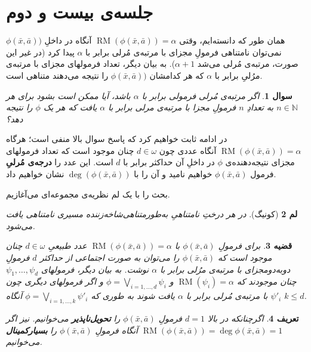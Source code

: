 \documentclass[12pt,a4paper]{report}
\theoremstyle{colorhead}
\newtheorem{thm}{قضیه}
\newtheorem{defn}[thm]{تعریف}
\newtheorem{soal}[thm]{سوال}
\newtheorem{lem}[thm]{لم}
\DeclareMathOperator{\RM}{RM}
\begin{document}
\section{جلسه‌ی بیست و دوم}
همان طور که دانسته‌ایم،
وقتی
$\RM(\phi(\bar{x},\bar{a}))=\alpha$
آنگاه در داخلِ
$\phi(\bar{x},\bar{a}))$
نمی‌توان نامتناهی فرمولِ مجزای با مرتبه‌ی مُرلی برابر با 
$\alpha$
پیدا کرد
(در غیر این صورت، مرتبه‌ی مُرلی 
می‌شد
$\alpha+1$).
 به بیان دیگر، تعداد فرمولهای مجزای با مرتبه‌ی مرُلیِ برابر با 
$\alpha$
که هر کدامشان
$\phi(\bar{x},\bar{a}))$
را نتیجه می‌دهند متناهی است. 
\begin{soal}
اگر مرتبه‌‌ی مُرلی فرمولی برابر با 
$\alpha$
باشد، آیا ممکن است بشود برای هر
$n\in \mathbb{N}$
به تعدادِ
$n$
فرمولِ مجزا با مرتبه‌ی مرلی برابر با
$\alpha$
 یافت که هر یک
$\phi$
را نتیجه دهد؟
	\end{soal}
در ادامه ثابت خواهیم کرد که پاسخ سوال بالا منفی است؛ هرگاه
$\RM(\phi(\bar{x},\bar{a}))=\alpha$
آنگاه عددی چون
$d\in \omega$
چنان موجود است که تعداد فرمولهای مجزای نتیجه‌دهنده‌ی
$\phi$
در داخلِ آن حداکثر برابر با 
$d$
است. این عدد را 
\textbf{درجه‌ی مُرلیِ}
فرمول
$\phi(\bar{x},\bar{a})$
خواهیم نامید و آن را با
$\deg(\phi(\bar{x},\bar{a}))$
نشان خواهیم داد.
\par 
بحث را با یک لم نظریه‌ی مجموعه‌ای می‌آغازیم.
\begin{lem}[کونیگ]
\label{koenig}
در 	هر درختِ نامتناهیِ به‌طور‌متناهی‌شاخه‌زننده  مسیری نامتناهی یافت می‌شود. 
	\end{lem}
\begin{thm}
\label{degree}
	برای فرمولِ
	$\phi(\bar{x},\bar{a})$
	با
	$\RM(\phi(\bar{x},\bar{a}))=\alpha$
	عدد طبیعیِ 
	$d\in \omega$
	چنان موجود است که 
	$\phi(\bar{x},\bar{a})$
	را می‌توان به صورت اجتماعی از حداکثر  
	$d$
	فرمولِ دوبه‌دومجزای با مرتبه‌ی مرُلی برابر با
	$\alpha$
	 نوشت. به بیان دیگر،  فرمولهای
	$\psi_1,\ldots,\psi_d$
	چنان موجودند که
	$\RM(\psi_i)=\alpha$
	و 
	$\phi=\bigvee_{i=1,\ldots,d} \psi_i$
و اگر فرمولهای دیگری چون
$\psi'_i$
با مرتبه‌ی مُرلی برابر با 
$\alpha$
یافت شوند به طوری که 
	$\phi=\bigvee_{i=1,\ldots,k} \psi'_i$
	آنگاه
	$k\leq d$.
	\end{thm}
\begin{defn}
اگرچنانکه در بالا
	$d=1$
	فرمولِ
	$\phi(\bar{x},\bar{a})$
	را 
	\textbf{تحویل‌ناپذیر}
	 می‌خوانیم. نیز اگر
	$\RM(\phi(\bar{x},\bar{a}))=\deg\phi(\bar{x},\bar{a})=1$
	آنگاه فرمولِ
$	\phi(\bar{x},\bar{a})$
را 
\textbf{بسیار‌کمینال }
می‌خوانیم. 
	\end{defn}
\end{document}
